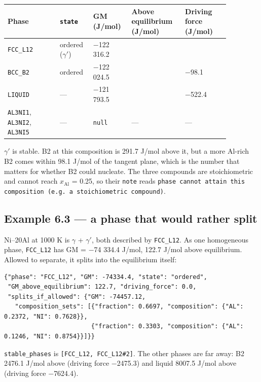 \documentclass[12pt,a4paper]{article}
\begin{document}
\begingroup\small
\begin{longtable}{>{\raggedright\arraybackslash}p{0.211\linewidth}>{\raggedright\arraybackslash}p{0.116\linewidth}>{\raggedright\arraybackslash}p{0.132\linewidth}>{\raggedright\arraybackslash}p{0.219\linewidth}>{\raggedright\arraybackslash}p{0.189\linewidth}}
\toprule
\textbf{Phase} & \textbf{\texttt{state}} & \textbf{GM (J/mol)} & \textbf{Above equilibrium (J/mol)} & \textbf{Driving force (J/mol)} \\
\midrule
\endhead
\texttt{FCC\_\allowbreak{}L12} & ordered (\(\gamma '\)) & \(-\)122 316.2 & 0.0 & 0.0 \\
\texttt{BCC\_\allowbreak{}B2} & ordered & \(-\)122 024.5 & 291.7 & \(-\)98.1 \\
\texttt{LIQUID} & --- & \(-\)121 793.5 & 522.7 & \(-\)522.4 \\
\texttt{AL3NI1}, \texttt{AL3NI2}, \texttt{AL3NI5} & --- & \texttt{null} & --- & --- \\
\bottomrule
\end{longtable}
\endgroup
\(\gamma '\) is stable. B2 at this composition is 291.7 J/mol above it, but a more Al-rich B2 comes within 98.1 J/mol of the tangent plane, which is the number that matters for whether B2 could nucleate. The three compounds are stoichiometric and cannot reach \(x_{\mathrm{Al}}\) = 0.25, so their \texttt{note} reads \texttt{phase cannot attain this composition (e.\allowbreak{}g.\allowbreak{} a stoichiometric compound)}.


\subsection*{Example 6.3 --- a phase that would rather split}
Ni--20Al at 1000 K is \(\gamma\) + \(\gamma '\), both described by \texttt{FCC\_\allowbreak{}L12}. As one homogeneous phase, \texttt{FCC\_\allowbreak{}L12} has GM = \(-\)74 334.4 J/mol, 122.7 J/mol above equilibrium. Allowed to separate, it splits into the equilibrium itself:

\begin{lstlisting}[basicstyle={\scriptsize\ttfamily}]
{"phase": "FCC_L12", "GM": -74334.4, "state": "ordered",
 "GM_above_equilibrium": 122.7, "driving_force": 0.0,
 "splits_if_allowed": {"GM": -74457.12,
   "composition_sets": [{"fraction": 0.6697, "composition": {"AL": 0.2372, "NI": 0.7628}},
                        {"fraction": 0.3303, "composition": {"AL": 0.1246, "NI": 0.8754}}]}}
\end{lstlisting}
\texttt{stable\_\allowbreak{}phases} is \texttt{[\textquotedbl{}FCC\_\allowbreak{}L12\textquotedbl{},\allowbreak{} \textquotedbl{}FCC\_\allowbreak{}L12\#2\textquotedbl{}]}. The other phases are far away: B2 2476.1 J/mol above (driving force \(-\)2475.3) and liquid 8007.5 J/mol above (driving force \(-\)7624.4).
\end{document}
